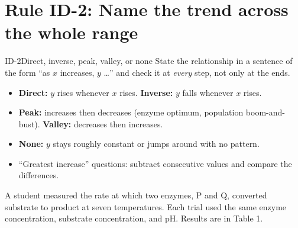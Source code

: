 \documentclass[11pt]{article}
\begin{document}

\section{Rule ID-2: Name the trend across the whole range}

\begin{rulebox}{ID-2}{Direct, inverse, peak, valley, or none}
State the relationship in a sentence of the form ``as $x$ increases, $y$ \dots'' and check it at \emph{every} step, not only at the ends.
\begin{itemize}
\item \textbf{Direct:} $y$ rises whenever $x$ rises. \textbf{Inverse:} $y$ falls whenever $x$ rises.
\item \textbf{Peak:} increases then decreases (enzyme optimum, population boom-and-bust). \textbf{Valley:} decreases then increases.
\item \textbf{None:} $y$ stays roughly constant or jumps around with no pattern.
\item ``Greatest increase'' questions: subtract consecutive values and compare the differences.
\end{itemize}
\end{rulebox}


A student measured the rate at which two enzymes, P and Q, converted substrate to product at seven temperatures. Each trial used the same enzyme concentration, substrate concentration, and pH. Results are in Table 1.

\passageend
\end{document}
